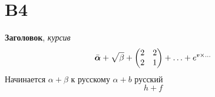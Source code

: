 \newpage

\section{B4}

\textbf{Заголовок}, \textit{курсив}
\begin{equation*}
    \bar{\vc{\alpha}} + \sqrt{\beta} + \begin{pmatrix}
        2 & 2  \\
        2 & 1  \\
    \end{pmatrix} + \ldots + e^{\smallvc{v} \times \ldots}
\end{equation*}
Начинается $\alpha + \beta$ к русскому $\alpha + b$ русский 
\begin{equation*}
    h + f
\end{equation*}
